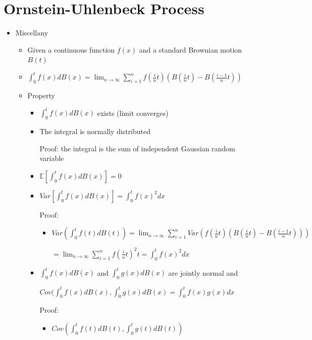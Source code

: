 \documentclass[a4paper]{article}
\begin{document}
\section{Ornstein-Uhlenbeck Process}
\begin{itemize}
    \item Miscellany
        \begin{itemize}
            \item Given a continuous function $f(x)$ and a standard Brownian motion $B(t)$
            \item $\int_0^t f(x) dB(x) = \lim_{n \rightarrow \infty} \sum_{i=1}^n f(\frac{i}{n}t)(B(\frac{i}{n}t) - B(\frac{i-1}{n}t))$
            \item Property
                \begin{itemize}
                    \item $\int_0^t f(x) dB(x)$ exists (limit converges)
                    \item The integral is normally distributed

                        Proof: the integral is the sum of independent Gaussian random variable
                    \item $\mathbb{E}[\int_0^t f(x) dB(x)] = 0$
                    \item $\mathit{Var}[\int_0^t f(x) dB(x)] = \int_0^t f(x)^2 dx$

                        Proof: 
                        \begin{itemize}
                            \item $\mathit{Var}(\int_0^t f(t) dB(t)) = \lim_{n \rightarrow \infty} \sum_{i=1}^n \mathit{Var}(f(\frac{i}{n}t)(B(\frac{i}{n}t) - B(\frac{i-1}{n}t)))$

                                $= \lim_{n \rightarrow \infty} \sum_{i=1}^n f(\frac{i}{n}t)^2 t = \int_0^t f(x)^2 dx$
                        \end{itemize}
                    \item $\int_0^t f(x) dB(x)$ and $\int_0^t g(x) dB(x)$ are jointly normal and

                        $\mathit{Cov}(\int_0^t f(x) dB(x), \int_0^t g(x) dB(x) = \int_0^t f(x)g(x) dx$

                        Proof: 
                        \begin{itemize}
                            \item $\mathit{Cov}(\int_0^t f(t) dB(t), \int_0^t g(t) dB(t))$


\end{itemize}
\end{itemize}
\end{itemize}
\end{itemize}
\end{document}
